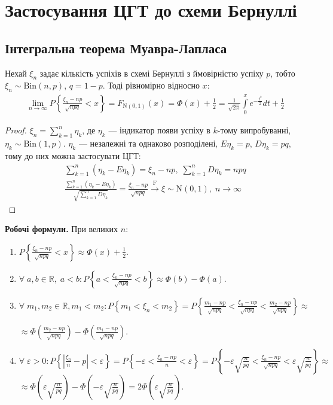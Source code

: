 \section{Застосування ЦГТ до схеми Бернуллі}
\subsection{Інтегральна теорема Муавра-Лапласа}
\begin{theorem*}
    Нехай $\xi_n$ задає кількість успіхів в схемі Бернуллі з ймовірністю успіху $p$, тобто $\xi_n \sim \mathrm{Bin}(n, p)$,
    $q = 1-p$.
    Тоді рівномірно відносно $x$:
    \begin{gather}
        \lim_{n \rightarrow \infty} P \left\{
            \frac{\xi_n - np}{\sqrt{npq}}
            < x
        \right\} = F_{\mathrm{N}(0, 1)}(x) = \Phi(x) + \frac{1}{2} = 
        \frac{1}{\sqrt{2\pi}} \int\limits_0^x e^{-\frac{t^2}{2}} dt + \frac{1}{2}
    \end{gather}
\end{theorem*}
\begin{proof}
    $\xi_n = \sum\limits_{k=1}^n \eta_k$, де $\eta_k$ --- індикатор появи успіху в $k$-тому випробуванні,
    $\eta_k \sim \mathrm{Bin}(1, p)$. $\eta_k$ --- незалежні та однаково розподілені, $E\eta_k = p$, $D\eta_k = pq$,
    тому до них можна застосувати ЦГТ:
    \begin{gather*}
        \sum\limits_{k=1}^n \left( \eta_k - E\eta_k\right) = \xi_n - np, \; \sum\limits_{k=1}^n D\eta_k = n p q \\
        \frac{\sum\limits_{k=1}^n \left( \eta_k - E\eta_k\right)}{\sqrt{\sum\limits_{k=1}^n D\eta_k}} =
         \frac{\xi_n - np}{\sqrt{n p q}} \overset{\mathrm{F}}{\longrightarrow} \xi \sim \mathrm{N}(0, 1), \; n\to \infty
    \end{gather*}
\end{proof}
\noindent\textbf{Робочі формули.} При великих $n$:
\begin{enumerate}
    \item $P\left\{ \frac{\xi_n - np}{\sqrt{n p q}} < x\right\} \approx \Phi(x) + \frac{1}{2}$.
    \item $\forall \; a, b \in \mathbb{R}, \; a<b : P\left\{a < \frac{\xi_n - np}{\sqrt{n p q}} < b\right\} \approx \Phi(b) - \Phi(a)$.
    \item $\forall \; m_1, m_2 \in \mathbb{R}, m_1<m_2 : P\left\{ m_1 < \xi_n < m_2\right\} = 
    P\left\{\frac{m_1 - np}{\sqrt{n p q}} < \frac{\xi_n - np}{\sqrt{n p q}} < \frac{m_2 - np}{\sqrt{n p q}}\right\} \approx$

    $\approx \Phi\left(\frac{m_2 - np}{\sqrt{n p q}}\right) - \Phi\left(\frac{m_1 - np}{\sqrt{n p q}}\right)$.
    \item $\forall \; \varepsilon > 0 : P\left\{ \left|\frac{\xi_n}{n} - p\right| < \varepsilon\right\} = 
    P\left\{-\varepsilon < \frac{\xi_n - np}{n} < \varepsilon\right\} =
    P\left\{-\varepsilon \sqrt{\frac{n}{pq}} < \frac{\xi_n - np}{\sqrt{n p q}} < \varepsilon \sqrt{\frac{n}{pq}}\right\} \approx$
    $\approx \Phi\left( \varepsilon \sqrt{\frac{n}{pq}}\right) - \Phi\left( -\varepsilon \sqrt{\frac{n}{pq}}\right) = 2\Phi\left( \varepsilon \sqrt{\frac{n}{pq}}\right)$.
\end{enumerate}
